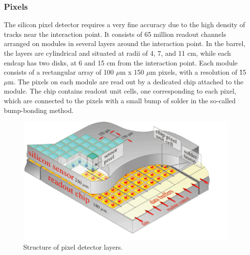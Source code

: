 \subsubsection{Pixels}
\label{exp:pixels}
The silicon pixel detector 
requires %
a very fine accuracy
due to the high density of tracks near the interaction point.  
It consists of 65 million readout channels 
arranged on modules in several layers around the interaction point.
In the barrel, the layers are cylindrical and situated at
radii of 4, 7, and 11 cm, 
while each endcap has two disks, at 6 and 15 cm from the
interaction point. 
Each module consists of a rectangular array of 100 $\mu$m x 150 $\mu$m pixels, 
with a resolution of \~15 $\mu$m.  
The pixels on each module are read out by a dedicated chip attached 
to the module. 
The chip contains readout unit cells, one corresponding to each pixel,
which are connected to the pixels with a small bump of solder 
in the so-called bump-bonding method.  

 \begin{figure}[htb]
  \begin{center}
    \includegraphics[width=360pt]{Figures/tracker-Pixelement.png}
  \end{center}
  \caption[\fixspacing Structure of pixel detector layers]
	  {\fixspacing Structure of pixel detector layers.}
  \label{fig:PixelLayers}
 \end{figure}

